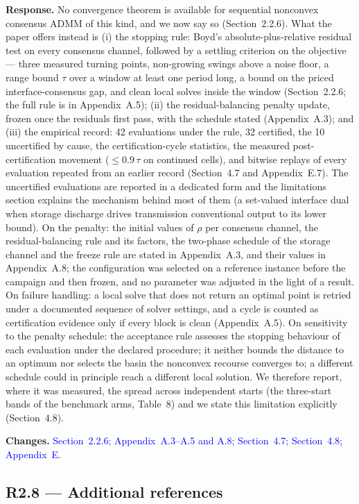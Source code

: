 \documentclass[11pt]{article}
\newcommand{\rresponse}[1]{\noindent\textbf{Response.} #1\par\smallskip}
\newcommand{\rchanges}[1]{\noindent\textbf{Changes.} \textcolor{blue}{#1}\par\medskip}
\begin{document}
\rresponse{No convergence theorem is available for sequential nonconvex consensus ADMM of this kind, and we
now say so (Section~2.2.6). What the paper offers instead is (i) the stopping rule: Boyd's absolute-plus-relative
residual test on every consensus channel, followed by a settling criterion on the objective --- three
measured turning points, non-growing swings above a noise floor, a range bound $\tau$ over a window at
least one period long, a bound on the priced interface-consensus gap, and clean local solves inside the
window (Section~2.2.6; the full rule is in Appendix~A.5); (ii) the residual-balancing penalty update, frozen once the residuals first pass,
with the schedule stated (Appendix~A.3); and (iii) the empirical record: 42 evaluations under the rule, 32
certified, the 10 uncertified by cause, the certification-cycle statistics, the measured
post-certification movement ($\le 0.9\,\tau$ on continued cells), and bitwise replays of every evaluation
repeated from an earlier record (Section~4.7 and Appendix~E.7). The uncertified evaluations are reported in a dedicated form and
the limitations section explains the mechanism behind most of them (a set-valued interface dual when
storage discharge drives transmission conventional output to its lower bound). On the penalty: the
initial values of $\rho$ per consensus channel, the residual-balancing rule and its factors, the two-phase
schedule of the storage channel and the freeze rule are stated in Appendix~A.3, and their values in Appendix~A.8; the configuration was
selected on a reference instance before the campaign and then frozen, and no parameter was adjusted in
the light of a result. On failure handling: a local solve that does not return an optimal point is retried
under a documented sequence of solver settings, and a cycle is counted as certification evidence only if
every block is clean (Appendix~A.5). On sensitivity to the penalty schedule: the acceptance rule assesses the stopping behaviour of each evaluation under the declared procedure; it neither bounds the
distance to an optimum nor selects the basin the nonconvex recourse converges to; a different
schedule could in principle reach a different local solution. We therefore report, where it was measured,
the spread across independent starts (the three-start bands of the benchmark arms, Table~8) and we
state this limitation explicitly (Section~4.8).}
\rchanges{Section~2.2.6; Appendix~A.3--A.5 and A.8; Section~4.7; Section~4.8; Appendix~E.}

\subsection*{R2.8 --- Additional references}
\end{document}
